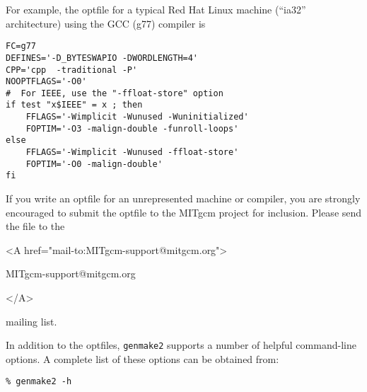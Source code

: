 For example, the optfile for a typical Red Hat Linux machine (``ia32''
architecture) using the GCC (g77) compiler is
\begin{verbatim}
FC=g77
DEFINES='-D_BYTESWAPIO -DWORDLENGTH=4'
CPP='cpp  -traditional -P'
NOOPTFLAGS='-O0'
#  For IEEE, use the "-ffloat-store" option
if test "x$IEEE" = x ; then
    FFLAGS='-Wimplicit -Wunused -Wuninitialized'
    FOPTIM='-O3 -malign-double -funroll-loops'
else
    FFLAGS='-Wimplicit -Wunused -ffloat-store'
    FOPTIM='-O0 -malign-double'
fi
\end{verbatim}

If you write an optfile for an unrepresented machine or compiler, you
are strongly encouraged to submit the optfile to the MITgcm project
for inclusion.  Please send the file to the
\begin{rawhtml} <A href="mail-to:MITgcm-support@mitgcm.org"> \end{rawhtml}
\begin{center}
  MITgcm-support@mitgcm.org
\end{center}
\begin{rawhtml} </A> \end{rawhtml}
mailing list.

In addition to the optfiles, \texttt{genmake2} supports a number of
helpful command-line options.  A complete list of these options can be
obtained from:
\begin{verbatim}
% genmake2 -h
\end{verbatim}

